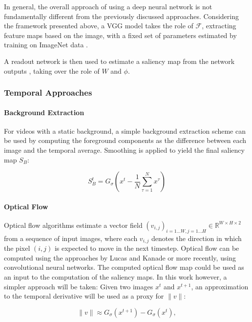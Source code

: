\documentclass[a4paper,twocolumn,10pt]{article}
\newcommand{\R}{\mathds{R}}
\newcommand{\F}{\mathcal{F}}
\begin{document}
In general, the overall approach of using a deep neural network is not fundamentally different from the previously discussed approaches.
Considering the framework presented above, a VGG model takes the role of $\F$, extracting feature maps based on the image, with a fixed set of parameters estimated by training on ImageNet data \cite{Simonyan2014}.

A readout network is then used to estimate a saliency map from the network outputs \cite{Kummerer2017b}, taking over the role of $W$ and $\phi$.

\subsubsection{Temporal Approaches}

\paragraph{Background Extraction}

For videos with a static background, a simple background extraction scheme can be used by computing the foreground components as the difference between each image and the temporal average.
Smoothing is applied to yield the final saliency map $S_B$:

\begin{equation}
  S_B^t = G_\sigma\left(x^t - \frac{1}{N} \sum_{\tau=1}^{N} x^\tau\right)
\end{equation}

\paragraph{Optical Flow}

Optical flow algorithms estimate a vector field ${\left(v_{i,j}\right)}_{i=1\dots W,j=1\dots H} \in \R^{W \times H \times 2}$ from a sequence of input images, where each $v_{i,j}$ denotes the direction in which the pixel $(i,j)$ is expected to move in the next timestep.
Optical flow can be computed using the approaches by Lucas and Kanade or more recently, using convolutional neural networks.
The computed optical flow map could be used as an input to the computation of the saliency maps.
In this work however, a simpler approach will be taken:
Given two images $x^t$ and $x^{t+1}$, an approximation to the temporal derivative will be used as a proxy for $\|v\|$:

\begin{equation}
    \|v\| \approx G_\sigma(x^{t+1}) - G_\sigma(x^{t}),
\end{equation}
\end{document}
